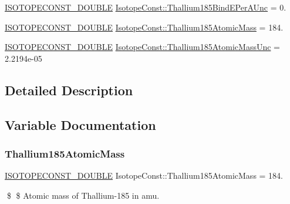 \begin{DoxyCompactItemize}
\mbox{\hyperlink{group___isotope_const-_macros_ga8f45a7272ce02c0b4c65c44636ed719a}{I\+S\+O\+T\+O\+P\+E\+C\+O\+N\+S\+T\+\_\+\+D\+O\+U\+B\+LE}} \mbox{\hyperlink{group___isotope_const-_thallium-_tl185_gae40a290363f12dd4cfbf2cd004a1c385}{Isotope\+Const\+::\+Thallium185\+Bind\+E\+Per\+A\+Unc}} = 0.
\item 
\mbox{\hyperlink{group___isotope_const-_macros_ga8f45a7272ce02c0b4c65c44636ed719a}{I\+S\+O\+T\+O\+P\+E\+C\+O\+N\+S\+T\+\_\+\+D\+O\+U\+B\+LE}} \mbox{\hyperlink{group___isotope_const-_thallium-_tl185_gaca6454c7712af479d4142ba328bd13bf}{Isotope\+Const\+::\+Thallium185\+Atomic\+Mass}} = 184.
\item 
\mbox{\hyperlink{group___isotope_const-_macros_ga8f45a7272ce02c0b4c65c44636ed719a}{I\+S\+O\+T\+O\+P\+E\+C\+O\+N\+S\+T\+\_\+\+D\+O\+U\+B\+LE}} \mbox{\hyperlink{group___isotope_const-_thallium-_tl185_ga2c9306398245b2417c6bfcf9d52ab456}{Isotope\+Const\+::\+Thallium185\+Atomic\+Mass\+Unc}} = 2.\+2194e-\/05
\end{DoxyCompactItemize}


\subsection{Detailed Description}


\subsection{Variable Documentation}
\mbox{\label{group___isotope_const-_thallium-_tl185_gaca6454c7712af479d4142ba328bd13bf}} 
\subsubsection{\texorpdfstring{Thallium185\+Atomic\+Mass}{Thallium185AtomicMass}}
{\footnotesize\ttfamily \mbox{\hyperlink{group___isotope_const-_macros_ga8f45a7272ce02c0b4c65c44636ed719a}{I\+S\+O\+T\+O\+P\+E\+C\+O\+N\+S\+T\+\_\+\+D\+O\+U\+B\+LE}} Isotope\+Const\+::\+Thallium185\+Atomic\+Mass = 184.}

\$ \$ Atomic mass of Thallium-\/185 in amu. \mbox{\label{group___isotope_const-_thallium-_tl185_ga2c9306398245b2417c6bfcf9d52ab456}} 
